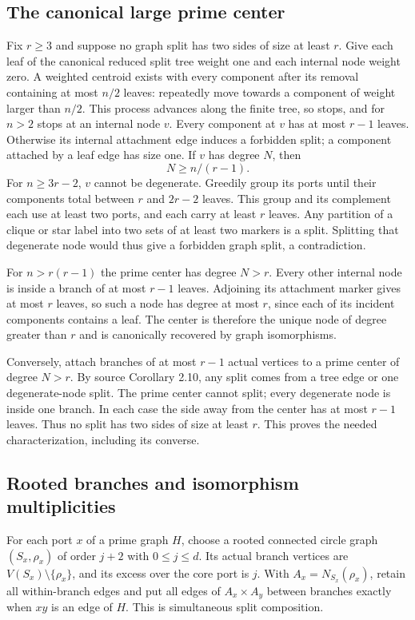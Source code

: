 \documentclass[11pt,letterpaper]{article}
\numberwithin{equation}{section}
\theoremstyle{definition}\newtheorem{definition}[theorem]{Definition}
\theoremstyle{remark}\newtheorem{remark}[theorem]{Remark}
\begin{document}
\subsection{The canonical large prime center}
Fix $r\ge3$ and suppose no graph split has two sides of size at
least $r$. Give each leaf of the canonical reduced split tree
weight one and each internal node weight zero. A weighted centroid
exists with every component after its removal containing at most
$n/2$ leaves: repeatedly move towards a component of weight
larger than $n/2$. This process advances along the finite tree,
so stops, and for $n>2$ stops at an internal node $v$.
Every component at $v$ has at most $r-1$ leaves. Otherwise its
internal attachment edge induces a forbidden split; a component
attached by a leaf edge has size one. If $v$ has degree $N$, then
\begin{equation}\label{cgr:fc:eq:core-size}
 N\ge n/(r-1).
\end{equation}
For $n\ge3r-2$, $v$ cannot be degenerate. Greedily group its
ports until their components total between $r$ and $2r-2$
leaves. This group and its complement each use at least two ports,
and each carry at least $r$ leaves. Any partition of a clique or
star label into two sets of at least two markers is a split.
Splitting that degenerate node would thus give a forbidden graph
split, a contradiction.

For $n>r(r-1)$ the prime center has degree $N>r$.
Every other internal node is inside a branch of at most $r-1$
leaves. Adjoining its attachment marker gives at most $r$ leaves,
so such a node has degree at most $r$, since each of its incident
components contains a leaf. The center is therefore the unique
node of degree greater than $r$ and is canonically recovered by
graph isomorphisms.

Conversely, attach branches of at most $r-1$ actual vertices to
a prime center of degree $N>r$. By source Corollary 2.10, any
split comes from a tree edge or one degenerate-node split. The
prime center cannot split; every degenerate node is inside one
branch. In each case the side away from the center has at most
$r-1$ leaves. Thus no split has two sides of size at least $r$.
This proves the needed characterization, including its converse.

\subsection{Rooted branches and isomorphism multiplicities}
For each port $x$ of a prime graph $H$, choose a rooted connected
circle graph $(S_x,\rho_x)$ of order $j+2$ with $0\le j\le d$.
Its actual branch vertices are $V(S_x)\setminus\{\rho_x\}$,
and its excess over the core port is $j$. With
$A_x=N_{S_x}(\rho_x)$, retain all within-branch edges and put all
edges of $A_x\times A_y$ between branches exactly when $xy$ is
an edge of $H$. This is simultaneous split composition.
\end{document}
